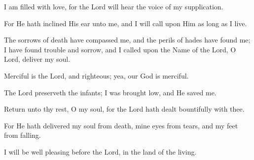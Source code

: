 I am filled with love, for the Lord will hear the voice of my supplication.

For He hath inclined His ear unto me, and I will call upon Him as long as I live.

The sorrows of death have compassed me, and the perils of hades have found me; I have found trouble and sorrow, and I called upon the Name of the Lord, O Lord, deliver my soul.

Merciful is the Lord, and righteous; yea, our God is merciful.

The Lord preserveth the infants; I was brought low, and He saved me.

Return unto thy rest, O my soul, for the Lord hath dealt bountifully with thee.

For He hath delivered my soul from death, mine eyes from tears, and my feet from falling.

I will be well pleasing before the Lord, in the land of the living.
